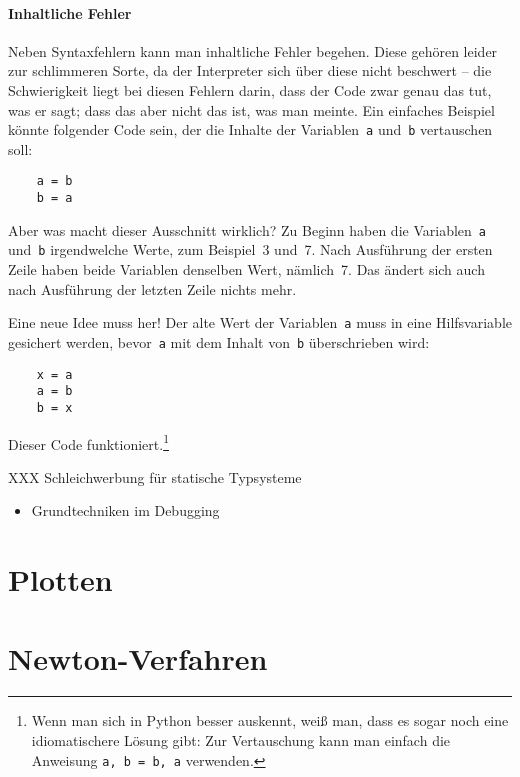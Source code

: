 \documentclass{blatt}
\begin{document}
\paragraph{Inhaltliche Fehler} Neben Syntaxfehlern kann man inhaltliche Fehler
begehen. Diese gehören leider zur schlimmeren Sorte, da der Interpreter sich
über diese nicht beschwert -- die Schwierigkeit liegt bei diesen Fehlern darin,
dass der Code zwar genau das tut, was er sagt; dass das aber nicht das ist, was
man meinte. Ein einfaches Beispiel könnte folgender Code sein, der die Inhalte
der Variablen~\texttt{a} und~\texttt{b} vertauschen soll:
\begin{verbatim}
    a = b
    b = a
\end{verbatim}
Aber was macht dieser Ausschnitt wirklich? Zu Beginn haben die
Variablen~\texttt{a} und~\texttt{b} irgendwelche Werte, zum Beispiel~3 und~7.
Nach Ausführung der ersten Zeile haben beide Variablen denselben Wert,
nämlich~7.  Das ändert sich auch nach Ausführung der letzten Zeile nichts mehr.

Eine neue Idee muss her! Der alte Wert der Variablen~\texttt{a} muss in eine
Hilfsvariable gesichert werden, bevor~\texttt{a} mit dem Inhalt von~\texttt{b}
überschrieben wird:
\begin{verbatim}
    x = a
    a = b
    b = x
\end{verbatim}
Dieser Code funktioniert.\footnote{Wenn man sich in Python besser auskennt,
weiß man, dass es sogar noch eine idiomatischere Lösung gibt: Zur Vertauschung
kann man einfach die Anweisung \texttt{a, b = b, a} verwenden.}

XXX Schleichwerbung für statische Typsysteme

\begin{itemize}
\item Grundtechniken im Debugging
\end{itemize}


\section{Plotten}


\section{Newton-Verfahren}
\end{document}
